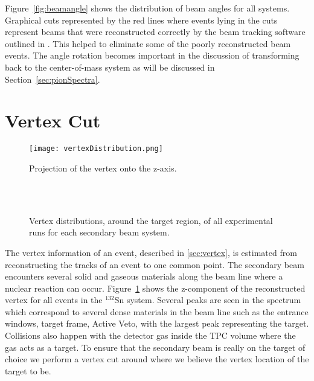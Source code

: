 Figure~\ref{fig:beamangle} shows the distribution of beam angles for all systems. Graphical cuts represented by the red lines where events lying in the cuts represent beams that were reconstructed correctly by the beam tracking software outlined in \cite{jon}. This helped to eliminate some of the poorly reconstructed beam events. The angle rotation becomes important in the discussion of transforming back to the center-of-mass system as will be discussed in Section~\ref{sec:pionSpectra}.



\section{Vertex Cut}
\label{sec:vertexcut}

\begin{figure}[!htb]
\centering
\texttt{[image: vertexDistribution.png]}
\caption{Projection of the vertex onto the z-axis.}
\label{fig:overviewVertex}
\end{figure}


\begin{figure}[!htb]%
    \centering
    \qquad
    \\
    \\

  	\caption{Vertex distributions, around the target region, of all experimental runs for each secondary beam system. }
	\label{fig:vertexdist}
\end{figure}


The vertex information of an event, described in \ref{sec:vertex}, is estimated from reconstructing the tracks of an event to one common point. The secondary beam encounters several solid and gaseous materials along the beam line where a nuclear reaction can occur. Figure~\ref{fig:overviewVertex} shows the z-component of the reconstructed vertex for all events in the ${}^{132}$Sn system. Several peaks are seen in the spectrum which correspond to several dense materials in the beam line such as the entrance windows, target frame, Active Veto, with the largest peak representing the target. Collisions also happen with the detector gas inside the TPC volume where the gas acts as a target. To ensure that the secondary beam is really on the target of choice we perform a vertex cut around where we believe the vertex location of the target to be.
 
